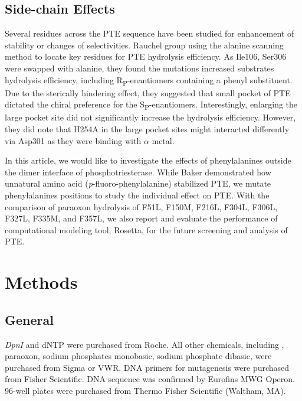 \begin{refsection}
\subsection{Side-chain Effects}
\label{sec:side-chain}

Several residues across the PTE sequence have been studied for enhancement of
stability \cite{Baker2011b,Yang2014a} or changes of
selectivities\cite{Bigley2013b,Chen-Goodspeed2001a,Pavelka2009}. Rauchel group
using the alanine scanning method to locate key residues for PTE hydrolysis
efficiency\cite{Chen-Goodspeed2001a}. As Ile106, Ser306 were swapped with
alanine, they found the mutations increased substrates hydrolysis
efficiency, including R\textsubscript{P}-enantiomers containing a phenyl
substituent. Due to the sterically hindering effect, they suggested that small
pocket of PTE dictated the chiral preference for the
S\textsubscript{P}-enantiomers. Interestingly, enlarging the large pocket site
did not significantly increase the hydrolysis efficiency. However, they did
note that H254A in the large pocket sites might interacted differently via
Asp301 as they were binding with $\alpha$ metal. 

In this article, we would like to investigate the effects of phenylalanines
outside the dimer interface of phosphotriesterase. While Baker 
demonstrated how unnatural amino acid (\emph{p}-fluoro-phenylalanine)
stabilized PTE, we mutate phenylalanines positions to study the individual
effect on PTE. With the comparison of paraoxon hydrolysis of F51L, F150M,
F216L, F304L, F306L, F327L, F335M, and F357L, we also report and evaluate the
performance of computational modeling tool, Rosetta, for the future screening
and analysis of PTE.

\section{Methods}

\subsection{General}

\emph{DpnI} and dNTP were purchased from Roche. All other chemicals, including
, paraoxon, sodium phosphates monobasic, sodium phosphate dibasic, were
purchased from Sigma or VWR. DNA primers for mutagenesis were purchased from
Fisher Scientific. DNA sequence was confirmed by Eurofins MWG Operon.  96-well
plates were purchased from Thermo Fisher Scientific (Waltham,
MA)\cite{Yang2014a}.


\end{refsection}
